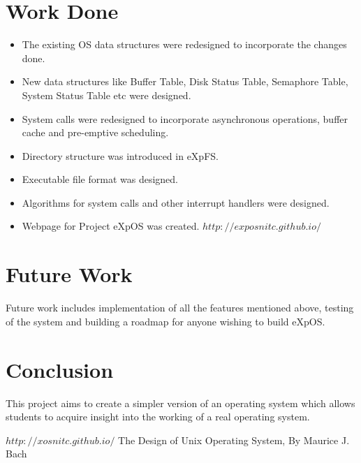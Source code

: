 \documentclass[10pt]{article}
\begin{document}
\section{Work Done}
\begin {itemize}
\item The existing OS data structures were redesigned to incorporate the changes done. 
\item New data structures like Buffer Table, Disk Status Table, Semaphore Table, System Status Table etc were designed.
\item System calls were redesigned to incorporate asynchronous operations, buffer cache and pre-emptive scheduling.
\item Directory structure was introduced in eXpFS.
\item Executable file format was designed.
\item Algorithms for system calls and other interrupt handlers were designed.
\item Webpage for Project eXpOS was created. \texttt{$http://exposnitc.github.io/$}
\end{itemize}
 
\section{Future Work}
Future work includes implementation of all the features mentioned above, testing of the system and building a roadmap for anyone wishing to build eXpOS.
\section{Conclusion}
This project aims to create a simpler version of an operating system which allows students to acquire insight into the working of a real operating system. 

\begin{thebibliography}{1}
\texttt{$http://xosnitc.github.io/$}
 The Design of Unix Operating System, By Maurice J. Bach
\end{thebibliography}
\end{document}
